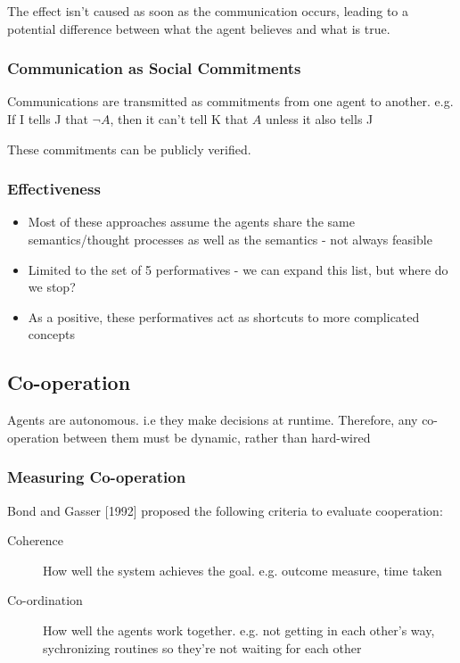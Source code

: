 The effect isn't caused as soon as the communication occurs, leading to a potential difference between what the agent believes and what is true.

\subsubsection{Communication as Social Commitments}
Communications are transmitted as commitments from one agent to another. e.g. If I tells J that $\neg A$, then it can't tell K that $A$ unless it also tells J

These commitments can be publicly verified. 

\subsubsection{Effectiveness}
\begin{itemize}
    \item Most of these approaches assume the agents share the same semantics/thought processes as well as the semantics - not always feasible
    \item Limited to the set of 5 performatives - we can expand this list, but where do we stop?
    \item As a positive, these performatives act as shortcuts to more complicated concepts
\end{itemize}


\subsection{Co-operation}
Agents are autonomous. i.e they make decisions at runtime. Therefore, any co-operation between them must be dynamic, rather than hard-wired

\subsubsection{Measuring Co-operation}
Bond and Gasser [1992] proposed the following criteria to evaluate cooperation:
\begin{description}
    \item [Coherence] How well the system achieves the goal. e.g. outcome measure, time taken
    \item [Co-ordination] How well the agents work together. e.g. not getting in each other's way, sychronizing routines so they're not waiting for each other
\end{description}

